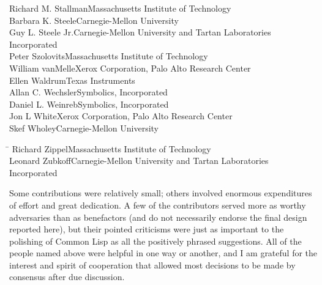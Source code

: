 \begin{tabbing}
Richard M. Stallman\>Massachusetts Institute of Technology \\
Barbara K. Steele\>Carnegie-Mellon University \\
Guy L. Steele Jr.\>Carnegie-Mellon University and Tartan Laboratories \\
                 \>Incorporated \\
Peter Szolovits\>Massachusetts Institute of Technology \\
William vanMelle\>Xerox Corporation, Palo Alto Research Center \\ Ellen
Waldrum\>Texas Instruments \\ Allan C. Wechsler\>Symbolics, Incorporated \\
Daniel L. Weinreb\>Symbolics, Incorporated \\
Jon L White\>Xerox Corporation, Palo Alto Research Center \\
Skef Wholey\>Carnegie-Mellon University
\end{tabbing}
\begin{tabbing}
\hskip8.5pc\=\kill
Richard Zippel\>Massachusetts Institute of Technology \\
Leonard Zubkoff\>Carnegie-Mellon University and Tartan Laboratories \\
               \>Incorporated
\end{tabbing}
Some contributions were relatively small; others involved enormous
expenditures of effort and great dedication.  A few of the contributors
served more as worthy adversaries than as benefactors (and do not
necessarily endorse the final design reported here),
but their pointed criticisms were just as important to the polishing of Common Lisp
as all the positively phrased suggestions.
All of the people named above were helpful in one way or another,
and I am grateful for the interest and spirit of cooperation
that allowed most decisions to be made by consensus after due discussion.

